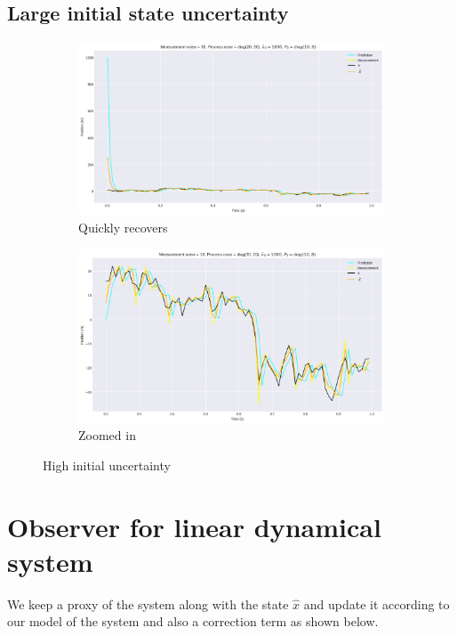 \documentclass[11pt]{article}
\begin{document}
\subsection*{Large initial state uncertainty}
\begin{figure}[H]
    \centering
    \begin{subfigure}[H]{0.49\linewidth}
        \includegraphics[width=\linewidth]{../kfinituncer1.png}
        \caption*{Quickly recovers}
    \end{subfigure}
    \begin{subfigure}[H]{0.49\linewidth}
        \includegraphics[width=\linewidth]{../kfinituncer2.png}
        \caption*{Zoomed in}
    \end{subfigure}
    \caption*{High initial uncertainty}
\end{figure}

\section{Observer for linear dynamical system}

We keep a proxy of the system along with the state $\hat{x}$ and update it according to our model
of the system and also a correction term as shown below. 
\end{document}
